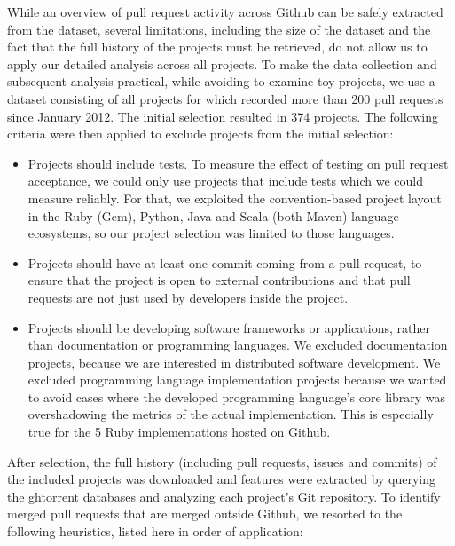\documentclass{sig-alternate}
\begin{document}
While an overview of pull request activity across Github can be safely extracted
from the \ghtorrent dataset, several limitations, including the size of the
dataset and the fact that the full history of the projects must be retrieved, do
not allow us to apply our detailed analysis across all projects. To make the
data collection and subsequent analysis practical, while avoiding to examine toy
projects, we use a dataset consisting of all projects for which \ghtorrent
recorded more than 200 pull requests since January 2012. The initial selection
resulted in 374 projects. The following criteria were then applied to exclude
projects from the initial selection:

\begin{itemize}

  \item Projects should include tests. To measure the effect of testing on pull
    request acceptance, we could only use projects that include tests which we
    could measure reliably. For that, we exploited the convention-based project
    layout in the Ruby (Gem), Python, Java and Scala (both Maven) language
    ecosystems, so our project selection was limited to those languages. 

  \item Projects should have at least one commit coming from a pull request, to
    ensure that the project is open to external contributions and that pull
    requests are not just used by developers inside the project.

  \item Projects should be developing software frameworks or applications,
    rather than documentation or programming languages. We excluded
    documentation projects, because we are interested in distributed software
    development. We excluded programming language implementation projects
    because we wanted to avoid cases where the developed programming language's
    core library was overshadowing the metrics of the actual implementation.
    This is especially true for the 5 Ruby implementations hosted on Github.

\end{itemize}

After selection, the full history (including pull requests, issues and commits)
of the included projects was downloaded and features were extracted by querying
the {\sc ght}orrent databases and analyzing each project's Git repository. To
identify merged pull requests that are merged outside Github, we resorted to the following heuristics, listed here in order of application:
\end{document}

